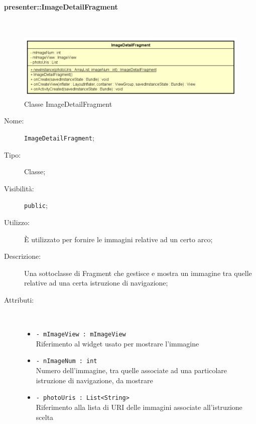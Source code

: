 \documentclass[../DefinizioneDiProdotto.tex]{subfiles}
\begin{document}
\paragraph{presenter::ImageDetailFragment}
\
\begin{figure}[H]
	\centering
	\includegraphics[width=\maxwidth]{img/ImageDetailFragment.png}
	\caption{Classe ImageDetailFragment}\label{fig:presenter::ImageDetailFragment} 
\end{figure}
\begin{description}
	\item[Nome:] \texttt{ImageDetailFragment};
	\item[Tipo:] Classe;
	\item[Visibilità:] \texttt{public};
	\item[Utilizzo:] È utilizzato per fornire le immagini relative ad un certo arco;
	\item[Descrizione:] Una sottoclasse di Fragment che gestisce e mostra un immagine tra quelle relative ad una certa istruzione di navigazione;
	\item[Attributi:] \
	\begin{itemize}
		\item \texttt{- mImageView : mImageView}\\
		Riferimento al widget usato per mostrare l'immagine
		
		\item \texttt{- nImageNum : int}\\
		Numero dell'immagine, tra quelle associate ad una particolare istruzione di navigazione,  da mostrare
		
		\item \texttt{- photoUris : List<String>}\\
		Riferimento alla lista di URI delle immagini associate all'istruzione scelta
		

\end{itemize}
\end{description}
\end{document}
